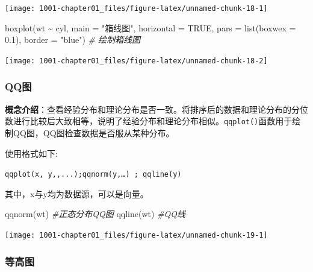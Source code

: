 \documentclass[
]{book}
\newenvironment{Shaded}{\begin{snugshade}}{\end{snugshade}}
\newcommand{\AttributeTok}[1]{\textcolor[rgb]{0.77,0.63,0.00}{#1}}
\newcommand{\CommentTok}[1]{\textcolor[rgb]{0.56,0.35,0.01}{\textit{#1}}}
\newcommand{\ConstantTok}[1]{\textcolor[rgb]{0.00,0.00,0.00}{#1}}
\newcommand{\FloatTok}[1]{\textcolor[rgb]{0.00,0.00,0.81}{#1}}
\newcommand{\FunctionTok}[1]{\textcolor[rgb]{0.00,0.00,0.00}{#1}}
\newcommand{\NormalTok}[1]{#1}
\newcommand{\SpecialCharTok}[1]{\textcolor[rgb]{0.00,0.00,0.00}{#1}}
\newcommand{\StringTok}[1]{\textcolor[rgb]{0.31,0.60,0.02}{#1}}
\begin{document}
\begin{center}\texttt{[image: 1001-chapter01\_files/figure-latex/unnamed-chunk-18-1]} \end{center}

\begin{Shaded}
\begin{Highlighting}[]
\FunctionTok{boxplot}\NormalTok{(wt }\SpecialCharTok{\textasciitilde{}}\NormalTok{ cyl, }\AttributeTok{main =} \StringTok{"箱线图"}\NormalTok{, }\AttributeTok{horizontal =} \ConstantTok{TRUE}\NormalTok{, }\AttributeTok{pars =} \FunctionTok{list}\NormalTok{(}\AttributeTok{boxwex =} \FloatTok{0.1}\NormalTok{), }
    \AttributeTok{border =} \StringTok{"blue"}\NormalTok{)  }\CommentTok{\# 绘制箱线图}
\end{Highlighting}
\end{Shaded}

\begin{center}\texttt{[image: 1001-chapter01\_files/figure-latex/unnamed-chunk-18-2]} \end{center}

\hypertarget{qqux56fe}{%
\subsubsection{QQ图}\label{qqux56fe}}

\textbf{概念介绍}：查看经验分布和理论分布是否一致。将排序后的数据和理论分布的分位数进行比较后大致相等，说明了经验分布和理论分布相似。\texttt{qqplot()}函数用于绘制QQ图，QQ图检查数据是否服从某种分布。

使用格式如下:

\texttt{qqplot(x,\ y,,...);qqnorm(y,…)\ ;\ qqline(y)}

其中，x与y均为数据源，可以是向量。

\begin{Shaded}
\begin{Highlighting}[]
\FunctionTok{qqnorm}\NormalTok{(wt)  }\CommentTok{\#正态分布QQ图}
\FunctionTok{qqline}\NormalTok{(wt)  }\CommentTok{\#QQ线}
\end{Highlighting}
\end{Shaded}

\begin{center}\texttt{[image: 1001-chapter01\_files/figure-latex/unnamed-chunk-19-1]} \end{center}

\hypertarget{ux7b49ux9ad8ux56fe}{%
\subsubsection{等高图}\label{ux7b49ux9ad8ux56fe}}
\end{document}
